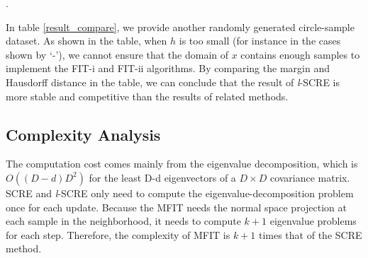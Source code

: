 \documentclass[aos,preprint]{imsart}
\theoremstyle{remark}
\begin{document}
\begin{appendix}
\begin{table}[h]
\caption{The margin and Hausdorff between $\cal \hat{G}$ and ${\cal \hat{G}}_{\ell}$. $\mathcal M$ varies with $h$ for SCRE and {\it l}-SCRE}.
\end{table}
In table \eqref{result_compare}, we provide another randomly generated circle-sample dataset. As shown in the table, when $h$ is too small (for instance in the cases shown by `-'), we cannot ensure that the domain of $x$ contains enough samples to implement the FIT-i and FIT-ii algorithms. By comparing the margin and Hausdorff distance in the table, we can conclude that the result of {\it l}-SCRE is more stable and competitive than the results of related methods.
\subsection{Complexity Analysis}
The computation cost comes mainly from the eigenvalue decomposition, which is $O((D-d)D^2)$ for the least D-d eigenvectors of a $D\times D$ covariance matrix. SCRE and {\it l}-SCRE only need to compute the eigenvalue-decomposition problem once for each update. Because the MFIT needs the normal space projection at each sample in the neighborhood, it needs to compute $k+1$ eigenvalue problems for each step. Therefore, the complexity of MFIT is $k+1$ times that of the SCRE method.
\end{appendix}
\end{document}
